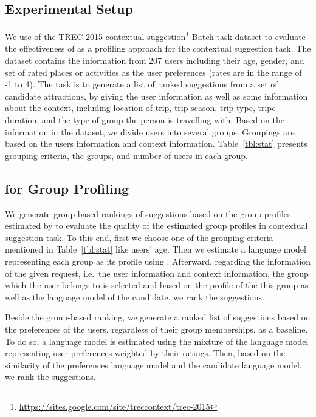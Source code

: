 \subsection{Experimental Setup}
\label{sec:cs_exp}

We use of the TREC 2015  contextual suggestion\footnote{\url{https://sites.google.com/site/treccontext/trec-2015}} Batch task dataset to evaluate the effectiveness of \acswlm as a profiling approach for the contextual suggestion task. The dataset contains the information from 207 users including their age, gender, and set of rated places or activities as the user preferences (rates are in the range of -1 to 4). 
The task is to generate a list of ranked suggestions from a set of candidate attractions, by giving the user information as well as some information about the context, including location of trip, trip season, trip type, tripe duration, and the type of group the person is travelling with. Based on the information in the dataset, we divide users into several groups. Groupings are based on the users information and context information. Table~\ref{tbl:stat} presents grouping criteria, the groups, and number of users in each group.

\subsection{\acswlm for Group Profiling}
\label{sec:groupprofiling}
We generate group-based rankings of suggestions based on the group profiles estimated by \acswlm to evaluate the quality of the estimated group profiles in contextual suggestion task. 
To this end, first we choose one of the grouping criteria mentioned in Table~\ref{tbl:stat} like users' age. Then we estimate a language model representing each group as its profile using \acswlm. Afterward, regarding the information of the given request, i.e.\ the user information and context information, the group which the user belongs to is selected and based on the profile of the this group as well as the language model of the candidate, we rank the suggestions.

Beside the group-based ranking, we generate a ranked list of suggestions based on the preferences of the users, regardless of their group memberships, as a baseline. To do so, a language model is estimated using the mixture of the language model representing user preferences weighted by their ratings. Then, based on the similarity of the preferences language model and the candidate language model, we rank the suggestions.

